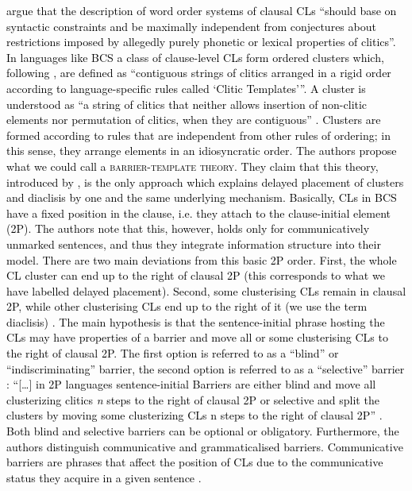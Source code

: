 \largerpage
 \textcolor{black}{\citet[194]{ZimmerlingKosta13} argue that the description of word order systems of clausal CLs “should base on syntactic constraints and be maximally independent from conjectures about restrictions imposed by allegedly purely phonetic or lexical properties of clitics”. In languages like BCS a class of clause-level CLs form ordered clusters which, following \citet{FranksKing00}, are defined as “contiguous strings of clitics arranged in a rigid order according to language-specific rules called ‘Clitic Templates’”. A cluster is understood as “a string of clitics that neither allows insertion of non-clitic elements nor permutation of clitics, when they are contiguous” \citep[181]{ZimmerlingKosta13}. Clusters are formed according to rules that are independent from other rules of ordering; in this sense, they arrange elements in an idiosyncratic order. The authors propose what we could call a \textsc{barrier-template theory}. They claim that this theory, introduced by \citet[287]{Zaliznjak93}, is the only approach which explains delayed placement of clusters and diaclisis by one and the same underlying mechanism. Basically, CLs in BCS have a fixed position in the clause, i.e. they attach to the clause-initial element (2P). The authors note that this, however, holds only for communicatively unmarked sentences, and thus they  integrate information structure into their model. There are two main deviations from this basic 2P order. First, the whole CL cluster can end up to the right of clausal 2P (this corresponds to what we have labelled delayed placement). Second, some clusterising CLs remain in clausal 2P, while other clusterising CLs end up to the right of it (we use the term diaclisis) \citep[196]{ZimmerlingKosta13}. The main hypothesis is that the sentence-initial phrase hosting the CLs may have properties of a barrier and move all or some clusterising CLs to the right of clausal 2P. The first option is referred to as a “blind” or “indiscriminating” barrier, the second option is referred to as a “selective” barrier \citep[196]{ZimmerlingKosta13}: “[\dots] in 2P languages sentence-initial Barriers are either blind and move all clusterizing clitics \textit{n} steps to the right of clausal 2P or selective and split the clusters by moving some clusterizing CLs n steps to the right of clausal 2P” \citep[197]{ZimmerlingKosta13}. Both blind and selective barriers can be optional or obligatory. Furthermore, the authors distinguish communicative and grammaticalised barriers. Communicative barriers are phrases that affect the position of CLs due to the communicative status they acquire in a given sentence \citep[198]{ZimmerlingKosta13}. }

